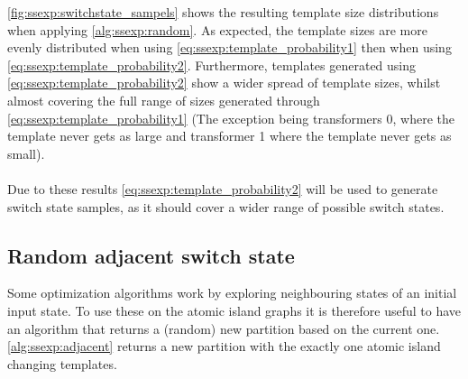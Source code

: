\autoref{fig:ssexp:switchstate_sampels} shows the resulting template size
distributions when applying \autoref{alg:ssexp:random}. As expected, the
template sizes are more evenly distributed when 
using \autoref{eq:ssexp:template_probability1}
then when using \autoref{eq:ssexp:template_probability2}. 
Furthermore, templates generated using
\autoref{eq:ssexp:template_probability2} show a wider
spread of template sizes, whilst almost covering the full range
of sizes generated through \autoref{eq:ssexp:template_probability1}
(The exception being transformers 0, where the template 
never gets as large and transformer 1 where the template never 
gets as small).\\
\\
Due to these results \autoref{eq:ssexp:template_probability2} will
be used to generate switch state samples, as it should cover a wider
range of possible switch states.

\subsection{Random adjacent switch state}

Some optimization algorithms work by exploring neighbouring states
of an initial input state. To use these on the atomic island graphs
it is therefore useful to have an algorithm that returns a (random) 
new partition based on the current one. \autoref{alg:ssexp:adjacent}
returns a new partition with the exactly one atomic island changing
templates. 

